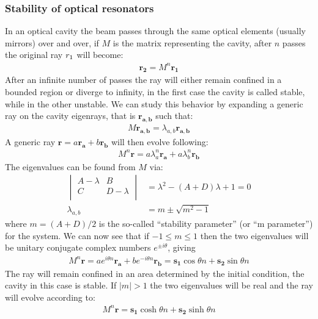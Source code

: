 \subsubsection{Stability of optical resonators}
In an optical cavity the beam passes through the same optical elements (usually mirrors) over and over, if $M$ is the matrix representing the cavity, after $n$ passes the original ray $\boldmath{r_1}$ will become:
\begin{align}
\boldsymbol{r_2} = M^n \boldsymbol{r_1}
\end{align}
After an infinite number of passes the ray will either remain confined in a bounded region or diverge to infinity, in the first case the cavity is called stable, while in the other unstable.
We can study this behavior by expanding a generic ray on the cavity eigenrays, that is $\boldsymbol{r_{a,b}}$ such that:
\begin{align}
M \boldsymbol{r_{a,b}} = \lambda_{a,b} \boldsymbol{r_{a,b}}
\end{align}
A generic ray $\boldsymbol{r} = a \boldsymbol{r_{a}} + b \boldsymbol{r_{b}}$ will then evolve following:
\begin{align}
M^n \boldsymbol{r} = a \lambda_{a}^n \boldsymbol{r_{a}} + a \lambda_{b}^n \boldsymbol{r_{b}}
\end{align}
The eigenvalues can be found from $M$ via:
\begin{align}
	\begin{vmatrix}
	A-\lambda & B\\
	C & D-\lambda\\
	\end{vmatrix}
	&= \lambda^2 - (A+D)\lambda +1 = 0 \\
	\lambda_{a,b} &= m \pm \sqrt{m^2-1}
\end{align}
where $m=(A+D)/2$ is the so-called ``stability parameter'' (or ``m parameter'') for the system.
We can now see that if $-1\le m\le1$ then the two eigenvalues will be unitary conjugate complex numbers $e^{\pm i\theta}$, giving
\begin{align}
M^n \boldsymbol{r} = a e^{i\theta n} \boldsymbol{r_{a}} + b e^{-i\theta n} \boldsymbol{r_{b}} = \boldsymbol{s_1} \cos\theta n + \boldsymbol{s_2} \sin\theta n
\end{align}
The ray will remain confined in an area determined by the initial condition, the cavity in this case is stable.
If $|m|>1$ the two eigenvalues will be real and the ray will evolve according to:
\begin{align}
	M^n \boldsymbol{r} = \boldsymbol{s_1} \cosh\theta n + \boldsymbol{s_2} \sinh\theta n
\end{align} 

